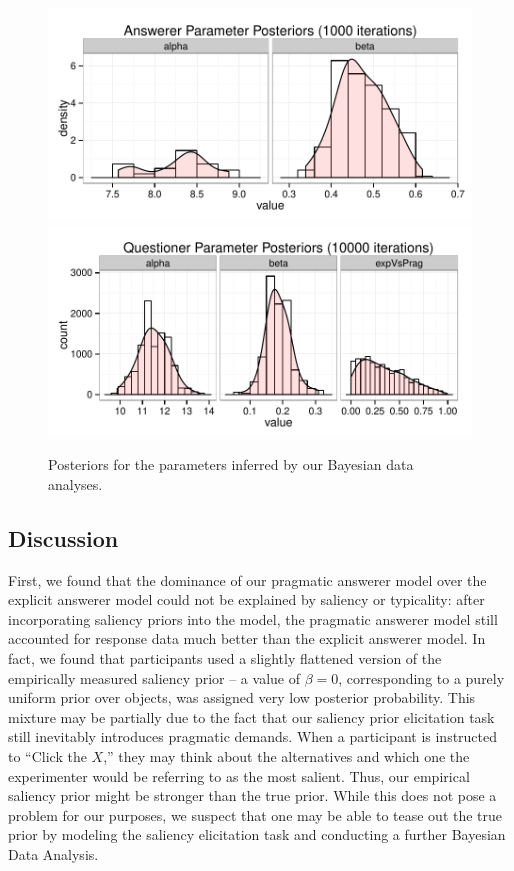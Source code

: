 \documentclass[12pt, floatsintext, jou]{apa6}
\begin{document}
\begin{figure}[t!]
\begin{center}
\includegraphics[scale=1]{AnswererParamPosteriors.pdf}
\includegraphics[scale=1]{QuestionerParamPosteriors.pdf}
\end{center}
\caption{Posteriors for the parameters inferred by our Bayesian data analyses.}
\label{fig:BayesianParamPosteriors}
\end{figure}
\subsection{Discussion}

First, we found that the dominance of our pragmatic answerer model over the explicit answerer model could not be explained by saliency or typicality: after incorporating saliency priors into the model, the pragmatic answerer model still accounted for response data much better than the explicit answerer model. In fact, we found that participants used a slightly flattened version of the empirically measured saliency prior -- a value of $\beta = 0$, corresponding to a purely uniform prior over objects, was assigned very low posterior probability. This mixture may be partially due to the fact that our saliency prior elicitation task still inevitably introduces pragmatic demands. When a participant is instructed to ``Click the $X$,'' they may think about the alternatives and which one the experimenter would be referring to as the most salient. Thus, our empirical saliency prior might be stronger than the true prior. While this does not pose a problem for our purposes, we suspect that one may be able to tease out the true prior by modeling the saliency elicitation task and conducting a further Bayesian Data Analysis.
\end{document}
